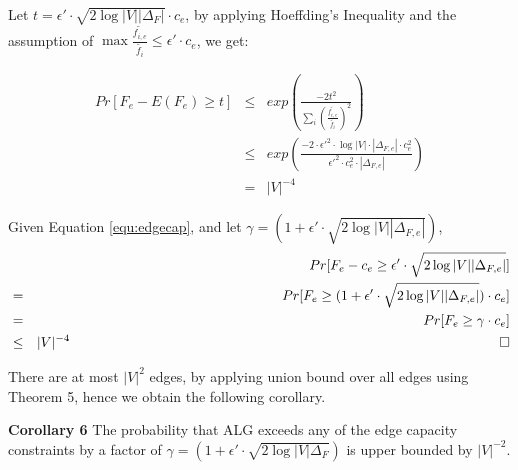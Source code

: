 \documentclass[conference]{IEEEtran}
\newcommand*{\QEDB}{\hfill\ensuremath{\square}}%
\begin{document}
Let $t=\epsilon' \cdot \sqrt{2\log|V||\Delta_F|} \cdot c_e$, by applying Hoeffding's Inequality and the assumption of $\max \frac{\tilde{f_{i,e}}}{\tilde{f_i}} \le \epsilon' \cdot c_e$, we get:

\begin{eqnarray}
Pr[F_e - E(F_e) \ge t] &\le& exp(\frac{-2t^2}{\sum_{i}(\frac{\tilde{f_{i,e}}}{\tilde{f_i}})^2}) \\ \nonumber
&\le& exp(\frac{-2 \cdot \epsilon'^2 \cdot \log|V| \cdot |\Delta_{F,e}| \cdot c_e^2}{\epsilon'^2 \cdot c_e^2 \cdot |\Delta_{F,e}|}) \\ \nonumber
&=& |V|^{-4}
\end{eqnarray}


Given Equation \ref{equ:edgecap}, and let $\gamma = (1+\epsilon' \cdot \sqrt{2\log|V||\Delta_{F,e}|})$,
\begin{eqnarray} \nonumber
&&Pr[F_e - c_e \ge \epsilon' \cdot \sqrt{2\log|V||\Delta_{F,e}|}] \\ \nonumber
&=& Pr[F_e \ge (1+\epsilon' \cdot \sqrt{2\log|V||\Delta_{F,e}|}) \cdot c_e] \\ \nonumber
&=& Pr[F_e \ge \gamma \cdot c_e] \\ \nonumber
&\le& |V|^{-4} \,\,\,\,\,\,\,\,\,\,\,\,\,\,\,\,\,\,\,\,\,\,\,\,\,\,\,\,\,\,\,\,\,\,\,\,\,\,\,\,\,\,\,\,\,\,\,\,\,\,\,\,\,\,\,\,\,\,\,\,\,\,\,\,\,\,\,\,\,\,\,\,\,\,\,\,\,\,\,\,\,\,\,\,\,\,\,\,\,\,\,\,\,\,\,\,\,\,\,\,\,\,\,\,\,\,\,\,\,\,\,\,\,\,\,\,\,\,\,\,\,\,\,\,\,\,\,\,\,\,\,\,\,\,\,\,\,\,\,\,\,\,\,\,\,\,\,\,\,\,\,\,\,\,\,\,\,\,\,\,\,\,\,\,\,\,\,\,\,\,\,\,\,\,\,\,\,\,\,\,\,\,\,\,\,\,\,\,\,\, \QEDB
\end{eqnarray}

%

There are at most $|V|^2$ edges, by applying union bound over all edges using Theorem 5, hence we obtain the following corollary.

\textbf{Corollary 6} The probability that ALG exceeds any of the edge capacity constraints by a factor of $\gamma = (1+\epsilon' \cdot \sqrt{2\log|V|\Delta_F})$ is upper bounded by $|V|^{-2}$.
\end{document}
